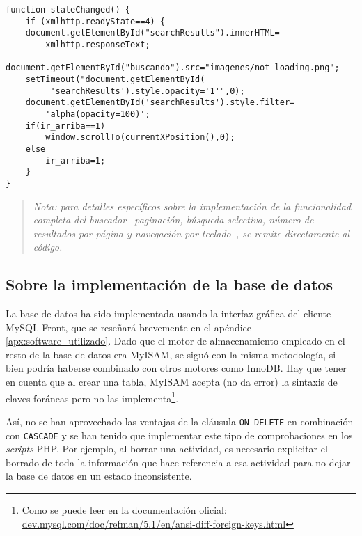 \begin{lstlisting}
function stateChanged() {
	if (xmlhttp.readyState==4) {
	document.getElementById("searchResults").innerHTML=
		xmlhttp.responseText;
	document.getElementById("buscando").src="imagenes/not_loading.png";
	setTimeout("document.getElementById(
		 'searchResults').style.opacity='1'",0);
	document.getElementById('searchResults').style.filter=
		'alpha(opacity=100)';
	if(ir_arriba==1)
		window.scrollTo(currentXPosition(),0);
	else
		ir_arriba=1;
	}
}
\end{lstlisting}

\begin{quote}
\textit{Nota: para detalles específicos sobre la implementación de la
funcionalidad completa del buscador --paginación, búsqueda selectiva, número de
resultados por página y navegación por teclado--, se remite directamente al
código.}
\end{quote}

\subsection{Sobre la implementación de la base de datos}

La base de datos ha sido implementada usando la interfaz gráfica del
cliente MySQL-Front, que se reseñará brevemente en el apéndice
\ref{apx:software_utilizado}. Dado que el motor de almacenamiento empleado en el
resto de la base de datos era MyISAM, se siguó con la misma metodología, si
bien podría haberse combinado con otros motores como InnoDB. Hay
que tener en cuenta que al crear una tabla, MyISAM acepta (no da
error) la sintaxis de claves foráneas pero no las implementa\footnote{Como se
puede leer en la documentación oficial: \newline
\href{http://dev.mysql.com/doc/refman/5.1/en/ansi-diff-foreign-keys.html }{
dev.mysql.com/doc/refman/5.1/en/ansi-diff-foreign-keys.html}}.

Así, no se han aprovechado las ventajas de la cláusula \verb|ON DELETE| en
combinación con \verb|CASCADE| y se han tenido que implementar este tipo de
comprobaciones en los \textit{scripts} PHP. Por ejemplo, al borrar una
actividad, es necesario explicitar el borrado de toda la información que hace
referencia a esa actividad para no dejar la base de datos en un estado
inconsistente.







